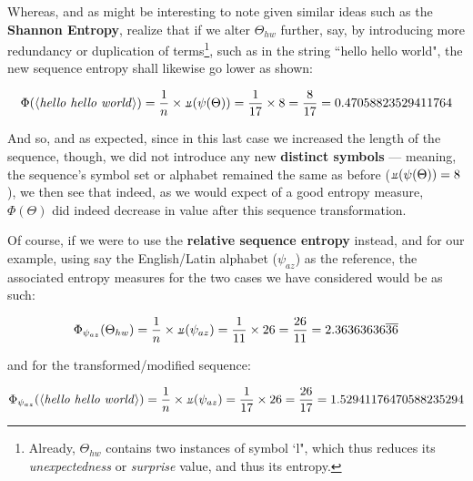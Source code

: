 \documentclass[a4paper, 18pt]{book} %
\newcommand{\invpi}{\rotatebox[origin=c]{180}{$\pi$}}
\begin{document}
Whereas, and as might be interesting to note given similar ideas such as the \textbf{Shannon Entropy}\cite{shannon1948mathematical}, realize that if we alter $\Theta_{hw}$ further, say, by introducing more redundancy or duplication of terms\footnote{Already, $\Theta_{hw}$ contains two instances of symbol `l", which thus reduces its \textit{unexpectedness} or \textit{surprise} value, and thus its entropy.}, such as in the string ``hello hello world", the new sequence entropy shall likewise go lower as shown:

\vspace{1em}
\begin{equation}
\Phi(\langle \text{\textit{hello hello world}} \rangle) = \frac{1}{n} \times \invpi(\psi(\Theta)) = \frac{1}{17} \times 8 = \frac{8}{17} = 0.47058823529411764
\end{equation}
\vspace{1em}


And so, and as expected, since in this last case we increased the length of the sequence, though, we did not introduce any new \textbf{distinct symbols} --- meaning, the sequence's symbol set or alphabet remained the same as before ($\invpi(\psi(\Theta)) = 8$), we then see that indeed, as we would expect of a good entropy measure, $\Phi(\Theta)$ did indeed decrease in value after this sequence transformation.

Of course, if we were to use the \textbf{relative sequence entropy} instead, and for our example, using say the English/Latin alphabet ($\psi_{az}$) as the reference, the associated entropy measures for the two cases we have considered would be as such:

\vspace{1em}
\begin{equation}
\Phi_{\psi_{az}}(\Theta_{hw}) = \frac{1}{n} \times \invpi(\psi_{az}) = \frac{1}{11} \times 26 = \frac{26}{11} = 2.36363636\overline{36}
\end{equation}
\vspace{1em}

and for the transformed/modified sequence:

\vspace{1em}
 \begin{equation}
\Phi_{\psi_{az}}(\langle \text{\textit{hello hello world}} \rangle) = \frac{1}{n} \times \invpi(\psi_{az}) = \frac{1}{17} \times 26 = \frac{26}{17} = 1.52941176470588235294
\end{equation}
\vspace{1em}
\end{document}
